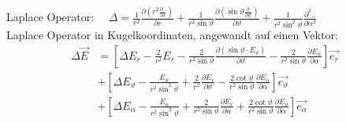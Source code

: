 Laplace Operator:   $\quad \Delta=\frac{1}{r^{2}} \frac{\partial\left(r^{2} \frac{\partial . .}{\partial r}\right)}{\partial r}+\frac{1}{r^{2} \sin \vartheta} \frac{\partial\left(\sin \vartheta \frac{\partial . \ddot{ }}{\partial \vartheta}\right)}{\partial \vartheta}+\frac{1}{r^{2} \sin ^{2} \vartheta} \frac{\partial^{2} . .}{\partial \alpha^{2}}$\\
Laplace Operator in Kugelkoordinaten, angewandt auf einen Vektor:
\begin{align*}
    \Delta \vec{E} & =\left[\Delta E_{r}-\frac{2}{r^{2}} E_{r}-\frac{2}{r^{2} \sin \vartheta} \frac{\partial\left(\sin \vartheta \cdot E_{\vartheta}\right)}{\partial \vartheta}-\frac{2}{r^{2} \sin \vartheta} \frac{\partial E_{\alpha}}{\partial \alpha}\right] \vec{e_{r}}        \\
                   & +\left[\Delta E_{\vartheta}-\frac{E_{\vartheta}}{r^{2} \sin ^{2} \vartheta}+\frac{2}{r^{2}} \frac{\partial E_{r}}{\partial \vartheta}-\frac{2 \cot \vartheta}{r^{2} \sin \vartheta} \frac{\partial E_{\alpha}}{\partial \alpha}\right] \vec{e_{\vartheta}}       \\
                   & +\left[\Delta E_{\alpha}-\frac{E_{\alpha}}{r^{2} \sin ^{2} \vartheta}+\frac{2}{r^{2} \sin \vartheta} \frac{\partial E_{r}}{\partial \alpha}+\frac{2 \cot \vartheta}{r^{2} \sin \vartheta} \frac{\partial E_{\vartheta}}{\partial \alpha}\right] \vec{e_{\alpha}}
\end{align*}



